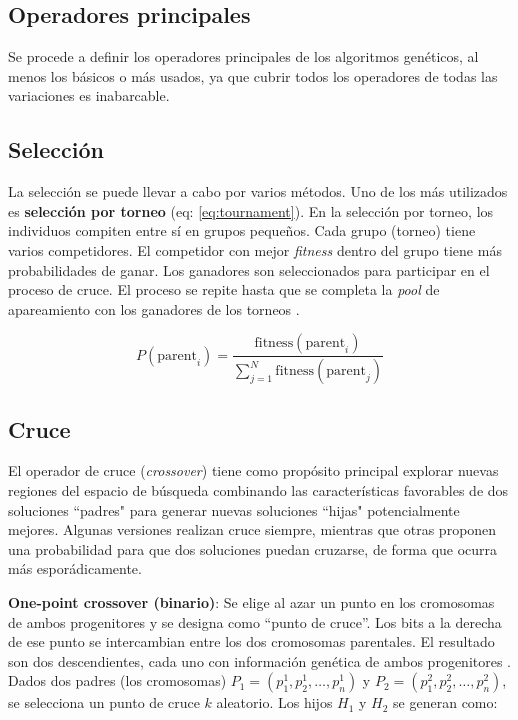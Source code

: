 \documentclass[12pt,letterpaper]{article}
\begin{document}
\subsection{Operadores principales}
Se procede a definir los operadores principales de los algoritmos genéticos, al menos los básicos o más usados, ya que cubrir todos los operadores de todas las variaciones es inabarcable.

\subsection{Selección}
La selección se puede llevar a cabo por varios métodos. Uno de los más utilizados es \textbf{selección por torneo} (eq: \ref{eq:tournament}). En la selección por torneo, los individuos compiten entre sí en grupos pequeños. Cada grupo (torneo) tiene varios competidores. El competidor con mejor \textit{fitness} dentro del grupo tiene más probabilidades de ganar. Los ganadores son seleccionados para participar en el proceso de cruce.
El proceso se repite hasta que se completa la \textit{pool} de apareamiento con los ganadores de los torneos \cite{miller_genetic_nodate}.

\begin{equation}
    P(\text{parent}_i) = \frac{\text{fitness}(\text{parent}_i)}{\sum_{j=1}^N \text{fitness}(\text{parent}_j)}
    \label{eq:tournament}
\end{equation}

\subsection{Cruce}
El operador de cruce (\textit{crossover}) tiene como propósito principal explorar nuevas regiones del espacio de búsqueda combinando las características favorables de dos soluciones ``padres" para generar nuevas soluciones ``hijas" potencialmente mejores. Algunas versiones realizan cruce siempre, mientras que otras proponen una probabilidad para que dos soluciones puedan cruzarse, de forma que ocurra más esporádicamente.

\textbf{One-point crossover (binario)}: Se elige al azar un punto en los cromosomas de
ambos progenitores y se designa como ``punto de cruce”. Los bits a la
derecha de ese punto se intercambian entre los dos cromosomas parentales.
El resultado son dos descendientes, cada uno con información genética de
ambos progenitores \cite{DAGDIA2020283}.
Dados dos padres (los cromosomas) \( P_1 = (p_1^1, p_2^1, \dots, p_n^1) \) y \( P_2 = (p_1^2, p_2^2, \dots, p_n^2) \), se selecciona un punto de cruce \( k \) aleatorio. Los hijos \( H_1 \) y \( H_2 \) se generan como:
\end{document}
